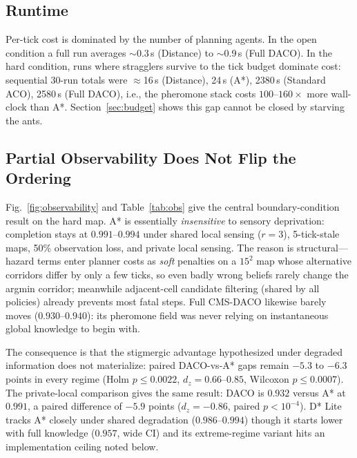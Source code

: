 ﻿\documentclass[conference]{IEEEtran}
\begin{document}
\subsection{Runtime}
Per-tick cost is dominated by the number of planning agents. In the open condition a full run averages $\sim$0.3\,s (Distance) to $\sim$0.9\,s (Full DACO). In the hard condition, runs where stragglers survive to the tick budget dominate cost: sequential 30-run totals were $\approx$16\,s (Distance), 24\,s (A*), 2380\,s (Standard ACO), 2580\,s (Full DACO), i.e., the pheromone stack costs $100$--$160\times$ more wall-clock than A*. Section~\ref{sec:budget} shows this gap cannot be closed by starving the ants.

\subsection{Partial Observability Does Not Flip the Ordering}
\label{sec:obs}
Fig.~\ref{fig:observability} and Table~\ref{tab:obs} give the central boundary-condition result on the hard map. A* is essentially \emph{insensitive} to sensory deprivation: completion stays at $0.991$--$0.994$ under shared local sensing ($r{=}3$), 5-tick-stale maps, 50\% observation loss, and private local sensing. The reason is structural---hazard terms enter planner costs as \emph{soft} penalties on a $15^2$ map whose alternative corridors differ by only a few ticks, so even badly wrong beliefs rarely change the argmin corridor; meanwhile adjacent-cell candidate filtering (shared by all policies) already prevents most fatal steps. Full CMS-DACO likewise barely moves ($0.930$--$0.940$): its pheromone field was never relying on instantaneous global knowledge to begin with.

The consequence is that the stigmergic advantage hypothesized under degraded information does not materialize: paired DACO-vs-A* gaps remain $-5.3$ to $-6.3$ points in every regime (Holm $p\leq0.0022$, $d_z=0.66$--$0.85$, Wilcoxon $p\leq0.0007$). The private-local comparison gives the same result: DACO is $0.932$ versus A* at $0.991$, a paired difference of $-5.9$ points ($d_z{=}{-}0.86$, paired $p{<}10^{-4}$). D* Lite tracks A* closely under shared degradation ($0.986$--$0.994$) though it starts lower with full knowledge ($0.957$, wide CI) and its extreme-regime variant hits an implementation ceiling noted below.
\end{document}

